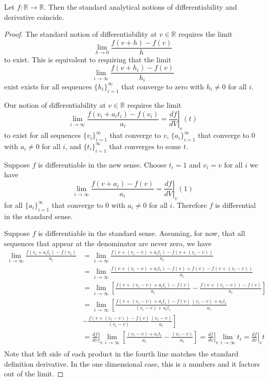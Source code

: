 \documentclass[11pt,letterpaper,fleqn]{memoir}
\begin{document}
\begin{prop}
	Let $f:\mathbb{R} \to \mathbb{R}$. Then the standard analytical notions of differentiability and derivative coincide.
\end{prop}
\begin{proof}
	The standard notion of differentiability at $v \in \mathbb{R}$ requires the limit
	$$ \lim\limits_{h \to 0} \frac{f(v + h) - f(v)}{h} $$
	to exist. This is equivalent to requiring that the limit
	$$ \lim\limits_{i \to \infty} \frac{f(v + h_i) - f(v)}{h_i} $$
	exist exists for all sequences $\{h_i\}_{i=1}^{\infty}$ that converge to zero with $h_i \neq 0$ for all $i$.
	
	Our notion of differentiability at $v \in \mathbb{R}$ requires the limit
	$$ \lim\limits_{i \to \infty} \frac{f(v_i + a_i t_i) - f(v_i)}{a_i} = \left.\frac{df}{dV} \right|_{v} (t)$$
	to exist for all sequences $\{v_i\}_{i=1}^{\infty}$ that converge to $v$, $\{a_i\}_{i=1}^{\infty}$ that converge to $0$ with $a_i \neq 0$ for all $i$, and $\{t_i\}_{i=1}^{\infty}$ that converges to some $t$.
	
	Suppose $f$ is differentiable in the new sense. Choose $t_i = 1$ and $v_i = v$ for all $i$ we have
	$$ \lim\limits_{i \to \infty} \frac{f(v + a_i) - f(v)}{a_i} = \left.\frac{df}{dV} \right|_{v} (1)$$
	for all $\{a_i\}_{i=1}^{\infty}$ that converge to $0$ with $a_i \neq 0$ for all $i$. Therefore $f$ is differential in the standard sense.
	
	Suppose $f$ is differentiable in the standard sense. Assuming, for now, that all sequences that appear at the denominator are never zero, we have
	\begin{align*}
	\lim\limits_{i \to \infty} \frac{f(v_i + a_i t_i) - f(v_i)}{a_i} &= \lim\limits_{i \to \infty} \frac{f(v + (v_i - v) + a_i t_i) - f(v + (v_i - v))}{a_i} \\
	&= \lim\limits_{i \to \infty} \frac{f(v + (v_i - v) + a_i t_i) - f(v) + f(v) - f(v + (v_i - v))}{a_i} \\
	&= \lim\limits_{i \to \infty} \left[\frac{f(v + (v_i - v) + a_i t_i) - f(v)}{a_i}
	- \frac{f(v + (v_i - v)) - f(v)}{a_i} \right]\\
	&= \lim\limits_{i \to \infty} \left[ \frac{f(v + (v_i - v) + a_i t_i) - f(v)}{(v_i - v) + a_i t_i} \frac{(v_i - v) + a_i t_i}{a_i} \right. \\
	&- \left.\frac{f(v + (v_i - v)) - f(v)}{(v_i - v)}  \frac{(v_i - v)}{a_i} \right] \\
	&=  \left.\frac{df}{dv} \right|_{v} \lim\limits_{i \to \infty} \left[ \frac{(v_i - v) + a_i t_i}{a_i} -  \frac{(v_i - v)}{a_i}\right] = \left.\frac{df}{dv} \right|_{v} \lim\limits_{i \to \infty} t_i = \left.\frac{df}{dv} \right|_{v} t \\
	\end{align*}
	Note that left side of each product in the fourth line matches the standard definition derivative. In the one dimensional case, this is a numbers and it factors out of the limit.
\end{proof}
\end{document}
